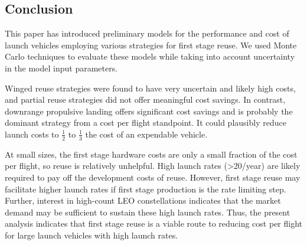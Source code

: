 \documentclass[conf]{new-aiaa}
\begin{document}
\begin{multicols}{2}
\section{Conclusion}

This paper has introduced preliminary models for the performance and cost of launch vehicles employing various strategies for first stage reuse. We used Monte Carlo techniques to evaluate these models while taking into account uncertainty in the model input parameters.

Winged reuse strategies were found to have very uncertain and likely high costs, and partial reuse strategies did not offer meaningful cost savings. In contrast, downrange propulsive landing offers significant cost savings and is probably the dominant strategy from a cost per flight standpoint. It could plausibly reduce launch costs to $\frac{1}{2}$ to $\frac{1}{3}$ the cost of an expendable vehicle.

At small sizes, the first stage hardware costs are only a small fraction of the cost per flight, so reuse is relatively unhelpful. High launch rates (>20/year) are likely required to pay off the development costs of reuse. However, first stage reuse may facilitate higher launch rates if first stage production is the rate limiting step. Further, interest in high-count LEO constellations indicates that the market demand may be sufficient to sustain these high launch rates. Thus, the present analysis indicates that first stage reuse is a viable route to reducing cost per flight for large launch vehicles with high launch rates. 


\end{multicols}
\end{document}
